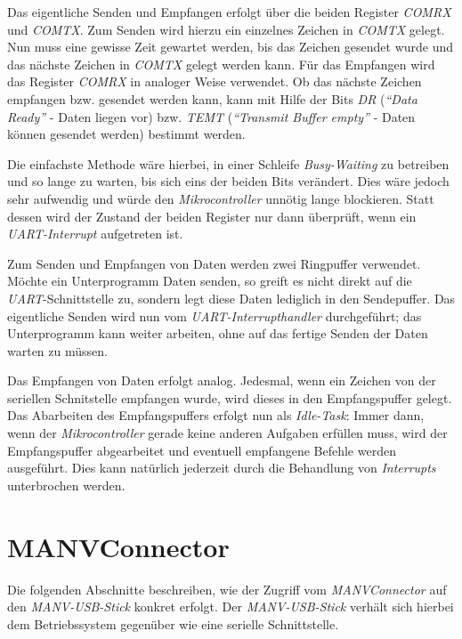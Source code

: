 Das eigentliche Senden und Empfangen erfolgt über die beiden Register \emph{COMRX} und \emph{COMTX}.
Zum Senden wird hierzu ein einzelnes Zeichen in \emph{COMTX} gelegt. Nun muss eine gewisse Zeit gewartet
werden, bis das Zeichen gesendet wurde und das nächste Zeichen in \emph{COMTX} gelegt werden kann.
Für das Empfangen wird das Register \emph{COMRX} in analoger Weise verwendet. Ob das nächste
Zeichen empfangen bzw. gesendet werden kann, kann mit Hilfe der Bits \emph{DR} (\emph{"`Data Ready"'} - Daten liegen vor)
bzw. \emph{TEMT} (\emph{"`Transmit Buffer empty"'} - Daten können gesendet werden) bestimmt werden.

Die einfachste Methode wäre hierbei, in einer Schleife \emph{Busy-Waiting} zu betreiben und so lange zu warten,
bis sich eins der beiden Bits verändert. Dies wäre jedoch sehr aufwendig und würde den \emph{Mikrocontroller}
unnötig lange blockieren. Statt dessen wird der Zustand der beiden Register nur dann überprüft, wenn ein 
\emph{UART-Interrupt} aufgetreten ist.

Zum Senden und Empfangen von Daten werden zwei Ringpuffer verwendet. Möchte ein Unterprogramm Daten senden,
so greift es nicht direkt auf die \emph{UART}-Schnittstelle zu, sondern legt diese Daten lediglich in den Sendepuffer.
Das eigentliche Senden wird nun vom \emph{UART-Interrupthandler} durchgeführt; das Unterprogramm kann weiter arbeiten,
ohne auf das fertige Senden der Daten warten zu müssen.

Das Empfangen von Daten erfolgt analog. Jedesmal, wenn ein Zeichen von der seriellen Schnitstelle empfangen
wurde, wird dieses in den Empfangspuffer gelegt. Das Abarbeiten des Empfangspuffers erfolgt nun als \emph{Idle-Task}:
Immer dann, wenn der \emph{Mikrocontroller} gerade keine anderen Aufgaben erfüllen muss, wird der Empfangspuffer
abgearbeitet und eventuell empfangene Befehle werden ausgeführt. Dies kann natürlich jederzeit durch 
die Behandlung von \emph{Interrupts} unterbrochen werden.

\section{MANVConnector}

Die folgenden Abschnitte beschreiben, wie der Zugriff vom \emph{MANVConnector} auf den \emph{MANV-USB-Stick} 
konkret erfolgt. Der \emph{MANV-USB-Stick} verhält sich hierbei dem Betriebssystem gegenüber wie eine serielle 
Schnittstelle.

